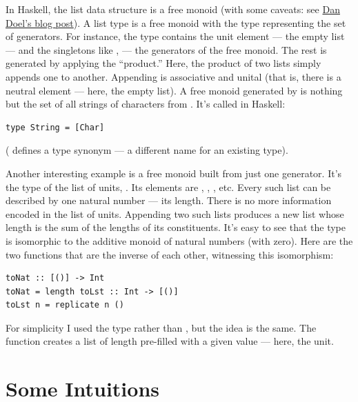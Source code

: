 In Haskell, the list data structure is a free monoid (with some caveats:
see \href{http://comonad.com/reader/2015/free-monoids-in-haskell/}{Dan
Doel's blog post}). A list type \code{{[}a{]}} is a free monoid with
the type  representing the set of generators. For instance,
the type \code{{[}Char{]}} contains the unit element --- the empty
list \code{{[}{]}} --- and the singletons like
\code{{[}'a'{]}}, \code{{[}'b'{]}} --- the
generators of the free monoid. The rest is generated by applying the
``product.'' Here, the product of two lists simply appends one to
another. Appending is associative and unital (that is, there is a
neutral element --- here, the empty list). A free monoid generated by
 is nothing but the set of all strings of characters from
. It's called  in Haskell:

\begin{Verbatim}[commandchars=\\\{\}]
type String = [Char]
\end{Verbatim}
( defines a type synonym --- a different name for an
existing type).

Another interesting example is a free monoid built from just one
generator. It's the type of the list of units, \code{{[}(){]}}. Its
elements are \code{{[}{]}}, \code{{[}(){]}}, \code{{[}(), (){]}},
etc. Every such list can be described by one natural number --- its
length. There is no more information encoded in the list of units.
Appending two such lists produces a new list whose length is the sum of
the lengths of its constituents. It's easy to see that the type
\code{{[}(){]}} is isomorphic to the additive monoid of natural
numbers (with zero). Here are the two functions that are the inverse of
each other, witnessing this isomorphism:

\begin{Verbatim}[commandchars=\\\{\}]
toNat :: [()] -> Int
toNat = length toLst :: Int -> [()]
toLst n = replicate n ()
\end{Verbatim}
For simplicity I used the type  rather than
, but the idea is the same. The function
 creates a list of length  pre-filled with a
given value --- here, the unit.

\section{Some Intuitions}\label{some-intuitions}

